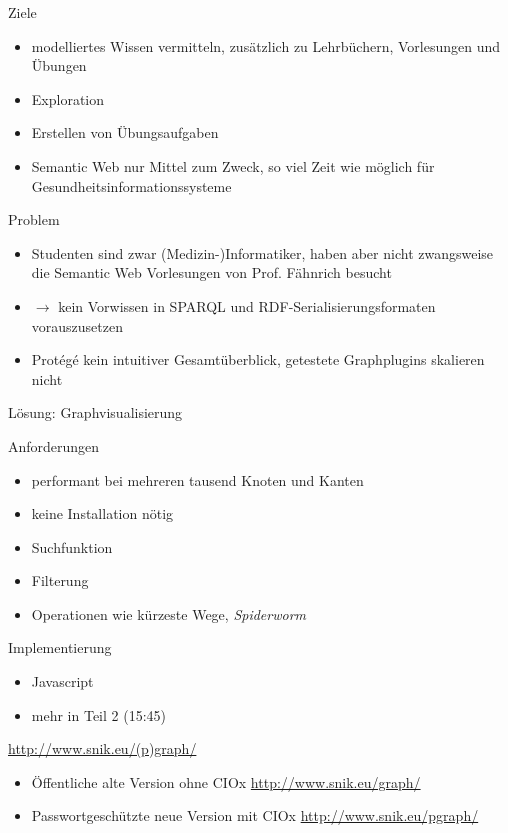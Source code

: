\documentclass[14pt,aspectratio=1610]{beamer}
\begin{document}
\begin{frame}{Ziele}
\begin{itemize}
\item modelliertes Wissen vermitteln, zusätzlich zu Lehrbüchern, Vorlesungen und Übungen
\item Exploration 
\item Erstellen von Übungsaufgaben
\item Semantic Web nur Mittel zum Zweck, so viel Zeit wie möglich für Gesundheitsinformationssysteme 
\end{itemize}
\end{frame}

\begin{frame}{Problem}
\begin{itemize}
\item Studenten sind zwar (Medizin-)Informatiker, haben aber nicht zwangsweise die Semantic Web Vorlesungen von Prof. Fähnrich besucht
\item $\rightarrow$ kein Vorwissen in SPARQL und RDF-Serialisierungsformaten vorauszusetzen
\item Protégé kein intuitiver Gesamtüberblick, getestete Graphplugins skalieren nicht
\end{itemize}
\end{frame}

\begin{frame}{Lösung: Graphvisualisierung}
\begin{block}{Anforderungen}
\begin{itemize}
\item performant bei mehreren tausend Knoten und Kanten 
\item keine Installation nötig 
\item Suchfunktion
\item Filterung
\item Operationen wie kürzeste Wege, \emph{Spiderworm}
\end{itemize}
\end{block}
\begin{block}{Implementierung}
\begin{itemize}
\item Javascript 
\item mehr in Teil 2 (15:45)
\end{itemize}
\end{block}
\end{frame}

\begin{frame}{\url{http://www.snik.eu/(p)graph/}}
\begin{itemize}
\item Öffentliche alte Version ohne CIOx \url{http://www.snik.eu/graph/}
\item Passwortgeschützte neue Version mit CIOx \url{http://www.snik.eu/pgraph/}
\end{itemize}
\end{frame}
\end{document}

